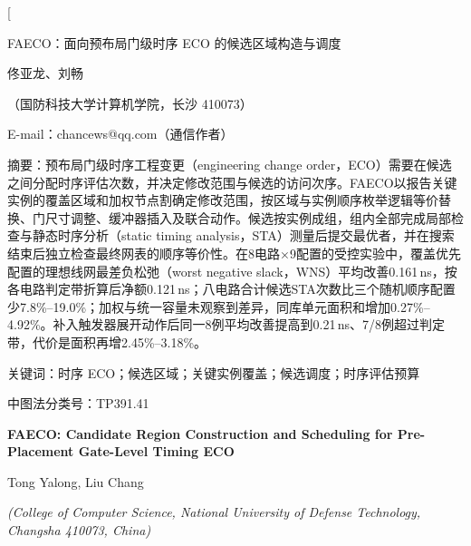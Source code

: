 \documentclass[twocolumn,10pt,fontset=windows]{ctexart}
\let\songti\songfamily\let\heiti\heifamily\let\fangsong\fangfamily
\begin{document}
\pagestyle{plain}

\twocolumn[
\vspace*{-0.25cm}
\begin{center}
{\heiti{} FAECO：面向预布局门级时序 ECO 的候选区域构造与调度}\par
\vspace{6pt}
{\fangsong{} 佟亚龙、刘畅}\par
\vspace{4pt}
{\songti\fontsize{8}{12}\selectfont（国防科技大学计算机学院，长沙 410073）}\par\vspace{2pt}
{\songti\fontsize{8}{12}\selectfont E-mail：chancews@qq.com（通信作者）}\par
\vspace{6pt}
\end{center}
\begin{flushleft}
  {\heiti\fontsize{8.5}{13}\selectfont 摘\quad 要：}{\songti\fontsize{8.5}{13}\selectfont 预布局门级时序工程变更（engineering change order，ECO）需要在候选之间分配时序评估次数，并决定修改范围与候选的访问次序。FAECO以报告关键实例的覆盖区域和加权节点割确定修改范围，按区域与实例顺序枚举逻辑等价替换、门尺寸调整、缓冲器插入及联合动作。候选按实例成组，组内全部完成局部检查与静态时序分析（static timing analysis，STA）测量后提交最优者，并在搜索结束后独立检查最终网表的顺序等价性。在8电路$\times$9配置的受控实验中，覆盖优先配置的理想线网最差负松弛（worst negative slack，WNS）平均改善0.161\,ns，按各电路判定带折算后净额0.121\,ns；八电路合计候选STA次数比三个随机顺序配置少7.8\%--19.0\%；加权与统一容量未观察到差异，同库单元面积和增加0.27\%--4.92\%。补入触发器展开动作后同一8例平均改善提高到0.21\,ns、7/8例超过判定带，代价是面积再增2.45\%--3.18\%。}
\par
\vspace{4pt}
{\heiti\fontsize{8.5}{13}\selectfont 关键词：}{\songti\fontsize{8.5}{13}\selectfont 时序 ECO；候选区域；关键实例覆盖；候选调度；时序评估预算}\par
\vspace{2pt}
{\songti\fontsize{8.5}{13}\selectfont 中图法分类号：TP391.41}\par
\vspace{3pt}
\end{flushleft}
\vspace{2pt}
\begin{center}
{\bfseries\fontsize{12.5}{16}\selectfont FAECO: Candidate Region Construction and Scheduling for Pre-Placement Gate-Level Timing ECO}\par
\vspace{3pt}
{\normalsize Tong Yalong, Liu Chang\par}
\vspace{3pt}
{\small \itshape (College of Computer Science, National University of Defense Technology, Changsha 410073, China)}\par
\vspace{4pt}
\end{center}
\end{document}
